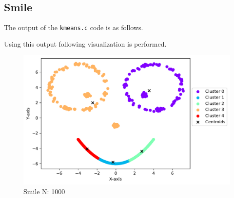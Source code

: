 \subsection{Smile}
The output of the \texttt{kmeans.c} code is as follows.


Using this output following visualization is performed.
\begin{figure}[H]
    \centering
    \includegraphics[width=.8\textwidth]{figures/plots/smile.pdf}
    \caption{Smile N: 1000}
    \label{smile}
\end{figure}



